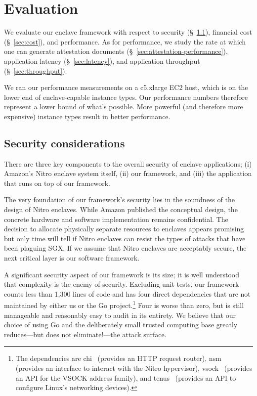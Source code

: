 \section{Evaluation}%
\label{sec:evaluation}

We evaluate our enclave framework with respect to
security (\S~\ref{sec:security}),
financial cost (\S~\ref{sec:cost}), and performance.  As for performance, we
study the rate at which one can generate
attestation documents (\S~\ref{sec:attestation-performance}),
application latency (\S~\ref{sec:latency}),
and application throughput (\S~\ref{sec:throughput}).

We ran our performance measurements on a c5.xlarge EC2 host, which is on the
lower end of enclave-capable instance types.  Our performance numbers therefore
represent a lower bound of what's possible.  More powerful (and therefore more
expensive) instance types result in better performance.

\subsection{Security considerations}%
\label{sec:security}


There are three key components to the overall security of enclave applications;
(i) Amazon's Nitro enclave system itself,
(ii) our framework, and
(iii) the application that runs on top of our framework.

The very foundation of our framework's security lies in the soundness of the
design of Nitro enclaves.  While Amazon published the conceptual design, the
concrete hardware and software implementation remains confidential.  The
decision to allocate physically separate resources to enclaves appears promising
but only time will tell if Nitro enclaves can resist the types of attacks that
have been plaguing SGX.  If we assume that Nitro enclaves are acceptably
secure, the next critical layer is our software framework.

A significant security aspect of our framework is its size; it is well
understood that complexity is the enemy of security.  Excluding unit tests, our
framework counts less than 1,300 lines of code and has four direct dependencies
that are not maintained by either us or the Go project.\footnote{The
dependencies are chi~\cite{chi} (provides an HTTP request router),
nsm~\cite{nsm} (provides an interface to interact with the Nitro hypervisor),
vsock~\cite{vsock} (provides an API for the VSOCK address family), and
tenus~\cite{tenus} (provides an API to configure Linux's networking devices).}
Four is worse than zero, but is still manageable and reasonably easy to audit in
its entirety.  We believe that our choice of using Go and the deliberately small
trusted computing base greatly reduces---but does not eliminate!---the attack
surface.

